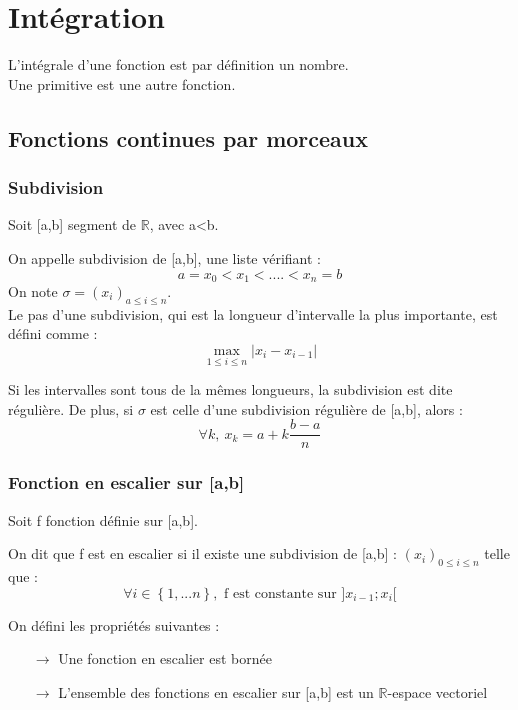 \chapter{Intégration}
\begin{de}
L'intégrale d'une fonction est par définition un nombre.\\
Une primitive est une autre fonction.
\end{de}
\section{Fonctions continues par morceaux}
\subsection{Subdivision}
Soit [a,b] segment de $\mathbb{R}$, avec a<b.
\begin{de}
On appelle subdivision de [a,b], une liste vérifiant :
$$a=x_0<x_1<....<x_n=b$$
On note $\sigma=(x_i)_{a\leq i\leq n}$.\\
Le pas d'une subdivision, qui est la longueur d'intervalle la plus importante, est défini comme :
$$\underset{1 \leq i \leq n}\max |x_i - x_{i-1}|$$
\end{de}
Si les intervalles sont tous de la mêmes longueurs, la subdivision est dite régulière. De plus, si $\sigma$ est celle d'une subdivision régulière de [a,b], alors :
$$\forall k,~ x_k = a+k\dfrac{b-a}{n}$$ 
\subsection{Fonction en escalier sur [a,b]}
Soit f fonction définie sur [a,b].
\begin{de}
 On dit que f est en escalier si il existe une subdivision de [a,b] : $(x_i)_{0 \leq i \leq n}$ telle que :
$$\forall i \in \left\lbrace1,...n\right\rbrace, \mbox{ f est constante sur } ]x_{i-1};x_i[$$
\end{de}
\begin{prop}
On défini les propriétés suivantes :
 \begin{itemize}
 \item[$\rightarrow$] Une fonction en escalier est bornée
 \item[$\rightarrow$] L'ensemble des fonctions en escalier sur [a,b] est un $\mathbb{R}$-espace vectoriel
\end{itemize}
\end{prop}
